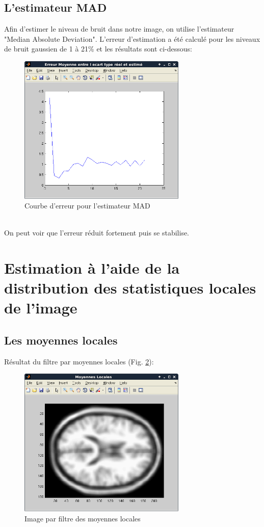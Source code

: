 \documentclass{report}
\begin{document}
\subsection{L'estimateur MAD}
Afin d'estimer le niveau de bruit dans notre image, on utilise l'estimateur "Median Absolute Deviation".
L'erreur d'estimation a été calculé pour les niveaux de bruit gaussien de 1 à 21\% et les résultats sont ci-dessous:
\begin{figure}[!ht]
	\centering
	\includegraphics[width = 8cm]{erreurMAD.png}
	\caption{\label{fig:mad}Courbe d'erreur pour l'estimateur MAD}
	
\end{figure}
~\\On peut voir que l'erreur réduit fortement puis se stabilise.

\section{Estimation à l'aide de la distribution des statistiques locales de l'image}
\subsection{Les moyennes locales}
Résultat du filtre par moyennes locales (Fig. \ref{fig:lm}):
\begin{figure}[!ht]
	\centering
	\includegraphics[width = 8cm]{moyenneLocal.png}
	\caption{\label{fig:lm}Image par filtre des moyennes locales}
\end{figure}
\end{document}
